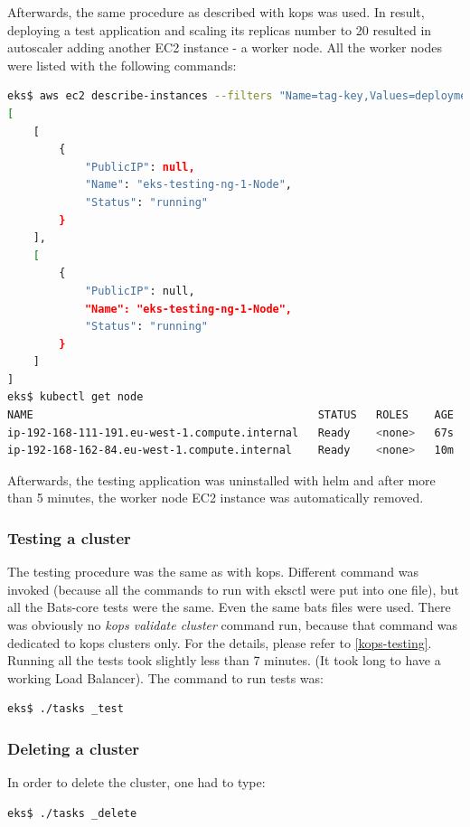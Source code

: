 Afterwards, the same procedure as described with kops was used. In result, deploying a test application and scaling its replicas number to 20 resulted in autoscaler adding another EC2 instance - a worker node. All the worker nodes were listed with the following commands:
\begin{lstlisting}[basicstyle=\tiny,caption={Listing EC2 instances, one was created by autoscaler},captionpos=b,language=Bash,xleftmargin=1cm]
eks$ aws ec2 describe-instances --filters "Name=tag-key,Values=deployment" --query "Reservations[*].Instances[*].{PublicIP:PublicIpAddress,Name:Tags[?Key=='Name']|[0].Value,Status:State.Name}"
[
    [
        {
            "PublicIP": null,
            "Name": "eks-testing-ng-1-Node",
            "Status": "running"
        }
    ],
    [
        {
            "PublicIP": null,
            "Name": "eks-testing-ng-1-Node",
            "Status": "running"
        }
    ]
]
eks$ kubectl get node
NAME                                            STATUS   ROLES    AGE   VERSION
ip-192-168-111-191.eu-west-1.compute.internal   Ready    <none>   67s   v1.16.8-eks-e16311
ip-192-168-162-84.eu-west-1.compute.internal    Ready    <none>   10m   v1.16.8-eks-e16311
\end{lstlisting}
Afterwards, the testing application was uninstalled with helm and after more than 5 minutes, the worker node EC2 instance was automatically removed.

\subsubsection{Testing a cluster}
The testing procedure was the same as with kops. Different command was invoked (because all the commands to run with eksctl were put into one file), but all the Bats-core tests were the same. Even the same bats files were used. There was obviously no \textit{kops validate cluster} command run, because that command was dedicated to kops clusters only. For the details, please refer to \ref{kops-testing}. Running all the tests took slightly less than 7 minutes. (It took long to have a working Load Balancer). The command to run tests was:
\begin{lstlisting}[basicstyle=\tiny,caption={Testing an eksctl cluster},captionpos=b,language=Bash,xleftmargin=1cm]
eks$ ./tasks _test
\end{lstlisting}

\subsubsection{Deleting a cluster}
In order to delete the cluster, one had to type:
\begin{lstlisting}[basicstyle=\tiny,caption={Deleting an eksctl cluster},captionpos=b,language=Bash,xleftmargin=1cm]
eks$ ./tasks _delete
\end{lstlisting}

